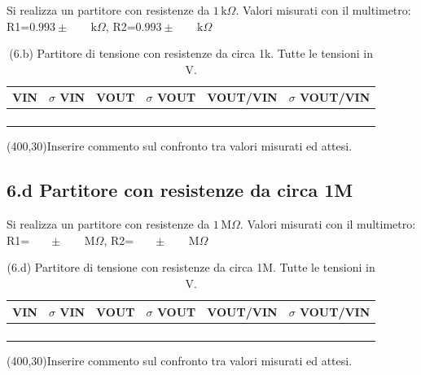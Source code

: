 \documentclass[10pt,a4paper]{article}
\newcommand{\exn}{\phantom{xxx}}
\begin{document}
Si realizza un partitore con resistenze da $1 \,\mathrm{k}\Omega$.
Valori misurati con il multimetro: R1=$0.993 \pm \exn \,\mathrm{k}\Omega$,
R2=$0.993 \pm \exn \,\mathrm{k}\Omega$


\begin{table}[h]
\centering
\begin{tabular}{|c|c|c|c|c|c|}
\hline 
VIN& $\sigma$ VIN  &VOUT	 & $\sigma$ VOUT& VOUT/VIN & $\sigma$ VOUT/VIN \\
\hline 
\exn & \exn & \exn & \exn & \exn &\exn \\
\exn & \exn & \exn & \exn & \exn &\exn \\
\exn & \exn & \exn & \exn & \exn &\exn \\
\exn & \exn & \exn & \exn & \exn &\exn \\
\hline 
\end{tabular} 
\caption{(6.b) Partitore di tensione con resistenze da circa 1k. Tutte le
tensioni in V.\label{t:par1}}
\end{table}


\framebox(400,30){Inserire commento sul confronto tra valori misurati
ed attesi.}


\subsection*{6.d Partitore con resistenze da circa 1M}
\par
Si realizza un partitore con resistenze da $1 \,\mathrm{M}\Omega$.
Valori misurati con il multimetro: R1=$\exn \pm \exn \,\mathrm{M}\Omega$,
R2=$\exn \pm \exn \,\mathrm{M}\Omega$


\begin{table}[h]
\centering
\begin{tabular}{|c|c|c|c|c|c|}
\hline 
VIN& $\sigma$ VIN  &VOUT	 & $\sigma$ VOUT& VOUT/VIN & $\sigma$ VOUT/VIN \\
\hline 
\exn & \exn & \exn & \exn & \exn &\exn \\
\exn & \exn & \exn & \exn & \exn &\exn \\
\exn & \exn & \exn & \exn & \exn &\exn \\
\exn & \exn & \exn & \exn & \exn &\exn \\
\hline 
\end{tabular} 
\caption{(6.d) Partitore di tensione con resistenze da circa 1M.
Tutte le tensioni in V.\label{t:par2}}
\end{table}


\framebox(400,30){Inserire commento sul confronto tra valori misurati ed attesi.}
\end{document}
